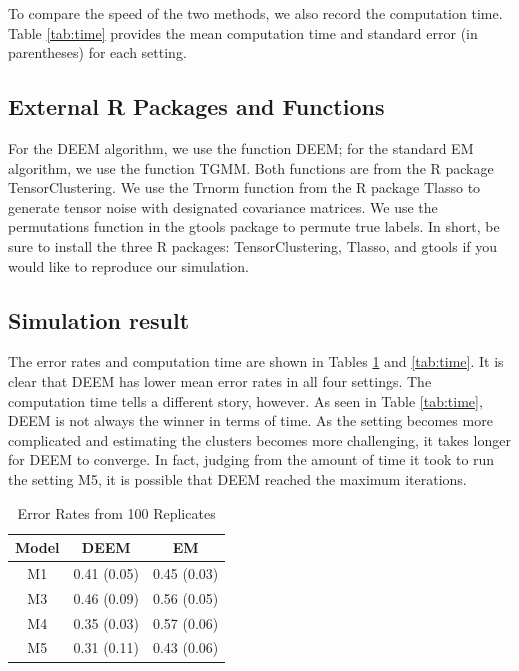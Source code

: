 \documentclass[11pt]{article}
\begin{document}
To compare the speed of the two methods, we also record the computation time. Table \ref{tab:time} provides the mean computation time and standard error (in parentheses) for each setting. 

\subsection{External R Packages and Functions}

For the DEEM algorithm, we use the function DEEM; for the standard EM algorithm, we use the function TGMM. Both functions are from the R package TensorClustering. We use the Trnorm function from the R package Tlasso to generate tensor noise with designated covariance matrices. We use the permutations function in the gtools package to permute true labels. In short, be sure to install the three R packages: TensorClustering, Tlasso, and gtools if you would like to reproduce our simulation. 


\subsection{Simulation result}

The error rates and computation time are shown in Tables \ref{tab:err} and \ref{tab:time}. It is clear that DEEM has lower mean error rates in all four settings. The computation time tells a different story, however. As seen in Table \ref{tab:time}, DEEM is not always the winner in terms of time. As the setting becomes more complicated and estimating the clusters becomes more challenging, it takes longer for DEEM to converge. In fact, judging from the amount of time it took to run the setting M5, it is possible that DEEM reached the maximum iterations. 

\begin{table}[H]
    \centering
    \begin{tabular}{c|cc}
       Model  &  DEEM & EM \\
       \hline
         M1 & 0.41 (0.05) & 0.45 (0.03) \\
         M3 &  0.46 (0.09) & 0.56 (0.05) \\
         M4 &  0.35 (0.03) & 0.57 (0.06) \\ 
         M5 &  0.31 (0.11) & 0.43 (0.06) \\
    \end{tabular}
    \caption{Error Rates from 100 Replicates}
    \label{tab:err}
\end{table}
\end{document}
